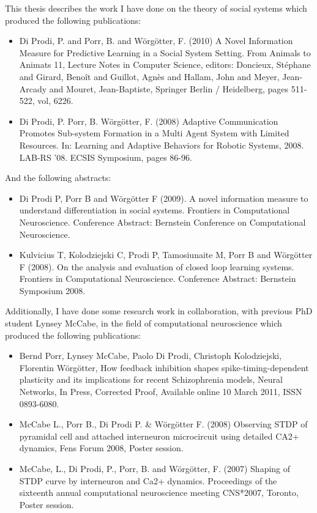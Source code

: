 
This thesis describes the work I have done on the theory of social systems
which produced the following publications:
\begin{itemize}
\item Di Prodi, P. and Porr, B. and W\"{o}rg\"{o}tter, F. (2010) A Novel Information
Measure for Predictive Learning in a Social System Setting. From Animals to
Animats 11, Lecture Notes in Computer Science, editors: Doncieux, Stéphane and
Girard, Benoît and Guillot, Agnès and Hallam, John and Meyer, Jean-Arcady and
Mouret, Jean-Baptiste, Springer Berlin / Heidelberg, pages 511-522, vol, 6226.

\item Di Prodi, P. Porr, B. W\"{o}rg\"{o}tter, F. (2008) Adaptive Communication
Promotes Sub-system Formation in a Multi Agent System with Limited Resources.
In: Learning and Adaptive Behaviors for Robotic Systems, 2008. LAB-RS '08. ECSIS
Symposium, pages 86-96.
\end{itemize}

And the following abstracts:
\begin{itemize}
\item Di Prodi P, Porr B and W\"{o}rg\"{o}tter F (2009). A novel information measure to
understand differentiation in social systems. Frontiers in Computational
Neuroscience. Conference Abstract: Bernstein Conference on Computational
Neuroscience. 

\item Kulvicius T, Kolodziejski C, Prodi P, Tamosiunaite M, Porr B and
W\"{o}rg\"{o}tter F (2008). On the analysis and evaluation of closed loop learning
systems. Frontiers in Computational Neuroscience. Conference Abstract: Bernstein
Symposium 2008. 
\end{itemize}

Additionally, I have done some research work in collaboration, with previous PhD
student Lynsey McCabe, in the field of computational neuroscience which produced
the following publications:
\begin{itemize}
\item Bernd Porr, Lynsey McCabe, Paolo Di Prodi, Christoph Kolodziejski,
Florentin W\"{o}rg\"{o}tter, How feedback inhibition shapes spike-timing-dependent
plasticity and its implications for recent Schizophrenia models, Neural
Networks, In Press, Corrected Proof, Available online 10 March 2011, ISSN
0893-6080.

\item McCabe L., Porr B., Di Prodi P. \& W\"{o}rg\"{o}tter F. (2008) Observing STDP
of pyramidal cell and attached interneuron microcircuit using detailed CA2+
dynamics, Fens Forum 2008, Poster session.

\item McCabe, L., Di Prodi, P., Porr, B. and W\"{o}rg\"{o}tter, F. (2007) Shaping of
STDP curve by interneuron and Ca2+ dynamics. Proceedings of the sixteenth annual
computational neuroscience meeting CNS*2007, Toronto, Poster session.
\end{itemize}

